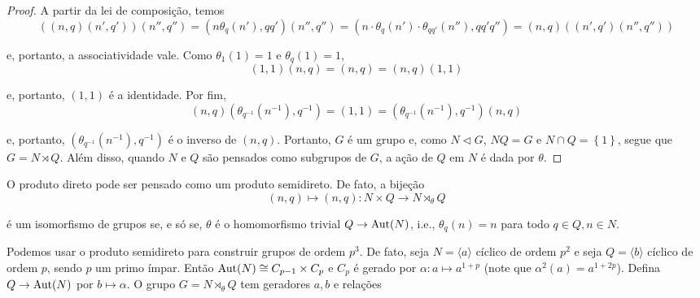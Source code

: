 	\begin{proof}
		A partir da lei de composição, temos
		\begin{equation*}
		( (n,q)(n',q')  )(n'',q'') = ( n\theta_q(n'), qq'     )(n'',q'') = ( n\cdot\theta_q(n')\cdot\theta_{qq'}(n''), qq'q''  ) = (n,q)( (n',q')(n'',q'') )
		\end{equation*}
		\par\vspace{0.3cm} e, portanto, a associatividade vale. Como $\theta_1(1) = 1$ e $\theta_q(1) = 1$,
		\begin{equation*}
		(1,1)(n,q) = (n,q) = (n,q)(1,1)
		\end{equation*}
		\par\vspace{0.3cm} e, portanto, $(1,1)$ é a identidade. Por fim, 
		\begin{equation*}
		(n,q)( \theta_{q^{-1}}(n^{-1}), q^{-1} ) = (1,1) = ( \theta_{q^{-1}}(n^{-1}), q^{-1} )(n,q)
		\end{equation*}
		\par\vspace{0.3cm} e, portanto, $( \theta_{q^{-1}}(n^{-1}), q^{-1} )$ é o inverso de $(n,q)$. Portanto, $G$ é um grupo e, como $N\vartriangleleft G$, $NQ=G$ e $N\cap Q = \left\{1\right\}$, segue que $G = N \rtimes Q$. Além disso, quando $N$ e $Q$ são pensados como subgrupos de $G$, a ação de $Q$ em $N$ é dada por $\theta$.
	\end{proof}
	\par\vspace{0.3cm} O produto direto pode ser pensado como um produto semidireto. De fato, a bijeção
	\begin{equation*}
	(n,q)\mapsto (n,q):N\times Q\to N \rtimes_{\theta} Q
	\end{equation*}
	\par\vspace{0.3cm} é um isomorfismo de grupos se, e só se, $\theta$ é o homomorfismo trivial $Q\to \operatorname{Aut}(N)$, i.e., $\theta_q(n) = n$ para todo $q\in Q, n\in N$.
	\par\vspace{0.3cm} Podemos usar o produto semidireto para construir grupos de ordem $p^3$. De fato, seja $N = \langle a \rangle$ cíclico de ordem $p^2$ e seja $Q = \langle b \rangle$
	cíclico de ordem $p$, sendo $p$ um primo ímpar. Então $\operatorname{Aut}(N)\cong C_{p-1}\times C_p$ e $C_p$ é gerado por $\alpha:a\mapsto a^{1+p}$ (note que $\alpha^2(a) = a^{1+2p}$). Defina $Q\to \operatorname{Aut}(N)$ por $b\mapsto\alpha$. O grupo $G = N\rtimes_{\theta} Q$ tem geradores $a,b$ e relações
